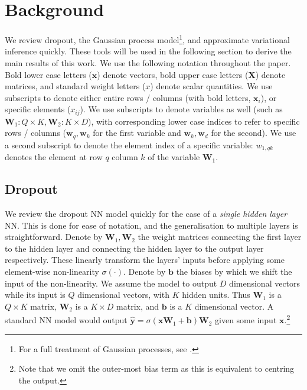 \documentclass{article} %
\newcommand{\x}{\mathbf{x}}
\newcommand{\Bb}{\mathbf{b}}
\newcommand{\y}{\mathbf{y}}
\newcommand{\w}{\mathbf{w}}
\newcommand{\W}{\mathbf{W}}
\newcommand{\X}{\mathbf{X}}
\theoremstyle{definition}
\begin{document}
%

\section{Background}


We review dropout, the Gaussian process model\footnote{For a full treatment of Gaussian processes, see \citet{Rasmussen2005Gaussian}.}, and approximate variational inference quickly. These tools will be used in the following section to derive the main results of this work. We use the following notation throughout the paper. Bold lower case letters ($\x$) denote vectors, bold upper case letters ($\X$) denote matrices, and standard weight letters ($x$) denote scalar quantities. We use subscripts to denote either entire rows / columns (with bold letters, $\x_i$), or specific elements ($x_{ij}$). We use subscripts to denote variables as well (such as $\W_1: Q \times K, \W_2: K \times D$), with corresponding lower case indices to refer to specific rows / columns ($\w_q,\w_k$ for the first variable and $\w_k,\w_d$ for the second).
We use a second subscript to denote the element index of a specific variable: $w_{1,qk}$ denotes the element at row $q$ column $k$ of the variable $\W_1$.

\subsection{Dropout} \label{sect:dropout}
We review the dropout NN model \citep{hinton2012improving,srivastava2014dropout} quickly for the case of a \textit{single hidden layer} NN. This is done for ease of notation, and the generalisation to multiple layers is straightforward. Denote by $\W_1, \W_2$ the weight matrices connecting the first layer to the hidden layer and connecting the hidden layer to the output layer respectively. These linearly transform the layers' inputs before applying some element-wise non-linearity $\sigma(\cdot)$.
Denote by $\Bb$ the biases by which we shift the input of the non-linearity. 
We assume the model to output $D$ dimensional vectors while its input is $Q$ dimensional vectors, with $K$ hidden units. Thus $\W_1$ is a $Q \times K$ matrix, $\W_2$ is a $K \times D$ matrix, and $\Bb$ is a $K$ dimensional vector. A standard NN model would output $\widehat{\y} = \sigma(\x \W_1 + \Bb) \W_2$ given some input $\x$.\footnote{Note that we omit the outer-most bias term as this is equivalent to centring the output.}
\end{document}
